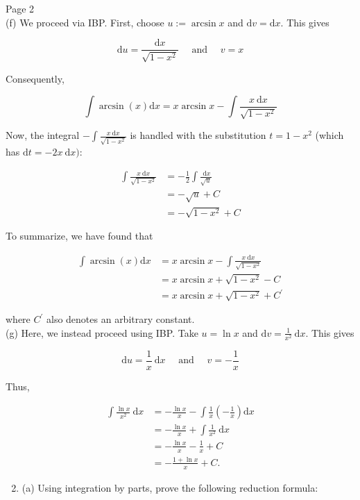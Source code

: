 \documentclass[10pt]{article}
\begin{document}
Page 2\\
(f) We proceed via IBP. First, choose $u:=\arcsin x$ and $\mathrm{d} v=\mathrm{d} x$. This gives

$$
\mathrm{d} u=\frac{\mathrm{d} x}{\sqrt{1-x^{2}}} \quad \text { and } \quad v=x
$$

Consequently,

$$
\int \arcsin (x) \mathrm{d} x=x \arcsin x-\int \frac{x \mathrm{~d} x}{\sqrt{1-x^{2}}}
$$

Now, the integral $-\int \frac{x \mathrm{~d} x}{\sqrt{1-x^{2}}}$ is handled with the substitution $t=1-x^{2}$ (which has $\mathrm{d} t=-2 x \mathrm{~d} x):$

$$
\begin{aligned}
\int \frac{x \mathrm{~d} x}{\sqrt{1-x^{2}}} & =-\frac{1}{2} \int \frac{\mathrm{~d} x}{\sqrt{u}} \\
& =-\sqrt{u}+C \\
& =-\sqrt{1-x^{2}}+C
\end{aligned}
$$

To summarize, we have found that

$$
\begin{aligned}
\int \arcsin (x) \mathrm{d} x & =x \arcsin x-\int \frac{x \mathrm{~d} x}{\sqrt{1-x^{2}}} \\
& =x \arcsin x+\sqrt{1-x^{2}}-C \\
& =x \arcsin x+\sqrt{1-x^{2}}+C^{\prime}
\end{aligned}
$$

where $C^{\prime}$ also denotes an arbitrary constant.\\
(g) Here, we instead proceed using IBP. Take $u=\ln x$ and $\mathrm{d} v=\frac{1}{x^{2}} \mathrm{~d} x$. This gives

$$
\mathrm{d} u=\frac{1}{x} \mathrm{~d} x \quad \text { and } \quad v=-\frac{1}{x}
$$

Thus,

$$
\begin{aligned}
\int \frac{\ln x}{x^{2}} \mathrm{~d} x & =-\frac{\ln x}{x}-\int \frac{1}{x}\left(-\frac{1}{x}\right) \mathrm{d} x \\
& =-\frac{\ln x}{x}+\int \frac{1}{x^{2}} \mathrm{~d} x \\
& =-\frac{\ln x}{x}-\frac{1}{x}+C \\
& =-\frac{1+\ln x}{x}+C .
\end{aligned}
$$

\begin{enumerate}
  \setcounter{enumi}{1}
  \item (a) Using integration by parts, prove the following reduction formula:
\end{enumerate}
\end{document}
